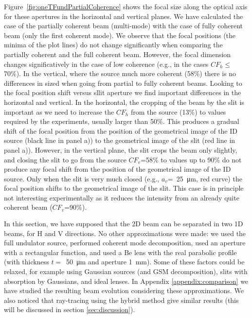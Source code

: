 \documentclass{iucr}              %
\begin{document}
Figure~\ref{fig:oneTFundPartialCoherence} shows the focal size along the optical axis for these apertures in the horizontal and vertical planes. We have calculated the case of the partially coherent beam (multi-mode) with the case of fully coherent beam (only the first coherent mode). We observe that the focal positions (the minima of the plot lines) do not change significantly when comparing the partially coherent and the full coherent beam. However, the focal dimension changes significatively in the case of low coherence (e.g., in the cases $CF_h\le$70\%). In the vertical, where the source much more coherent (58\%) there is no differences in sized when going from partial to fully coherent beams. Looking to the focal position shift versus sllit aperture we find important differences in the horizontal and vertical. In the horizontal, the cropping of the beam by the slit is important as we need to increase the $CF_h$ from the source (13\%) to values required by the experiments, usually larger than 50\%. This produces a gradual shift of the focal position from the position of the geometrical image of the ID source (black line in panel a)) to the geometrical image of the slit (red line in panel a)). However, in the vertical plane, the slit crops the beam only slightly, and closing the slit to go from the source $CF_v$=58\% to values up to 90\% do not produce any focal shift from the  position of the geometrical image of the ID source. Only when the slit is very much closed (e.g., $a_v$=~\SI{25}{\micro\meter}, red curve) the focal position shifts to the geometrical image of the slit. This case is in principle not interesting experimentally as it reduces the intensity from an already quite coherent beam ($CF_v$=90\%). 

In this section, we have supposed that the 2D beam can be separated in two 1D beams, for H and V directions. No other approximations were made: we used the full undulator source, performed coherent mode decomposition, used an aperture with a rectangular function, and used a Be lens with the real parabolic profile (with thickness $t=$~\SI{50}{\micro\meter} and aperture \SI{1}{\milli\meter}). Some of these factors could be relaxed, for example using Gaussian sources (and GSM decomposition), slits with absorption by Gaussians, and ideal lenses. In Appendix \ref{appendix:comparison} we have studied the resulting beam evolution considering these approximations. We also noticed that ray-tracing using the hybrid method \cite{codeHYBRID} give similar results (this will be discussed in section \ref{sec:discussion}). 
\end{document}
